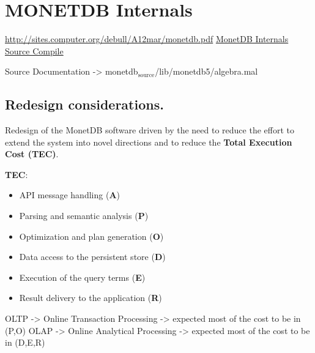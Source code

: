 \documentclass[11pt]{article}
\author{Lucas Pereira}
\date{\today}
\title{}
\begin{document}
\tableofcontents


\section{MONETDB Internals}
\label{sec:orgc4fc073}

\url{http://sites.computer.org/debull/A12mar/monetdb.pdf}
\href{https://www.monetdb.org/Documentation/MonetDBInternals/Overview}{MonetDB Internals}
\href{https://www.monetdb.org/Developers/SourceCompile}{Source Compile}

Source Documentation -> monetdb\(_{\text{source}}\)/lib/monetdb5/algebra.mal

\subsection{Redesign considerations.}
\label{sec:orgbc7f831}
Redesign of the MonetDB software driven by the need to reduce the effort to extend the system into novel directions and to reduce
the \textbf{Total Execution Cost (TEC)}.

\textbf{TEC}:
\begin{itemize}
\item API message handling                (\textbf{A})
\item Parsing and semantic analysis       (\textbf{P})
\item Optimization and plan generation    (\textbf{O})
\item Data access to the persistent store (\textbf{D})
\item Execution of the query terms        (\textbf{E})
\item Result delivery to the application  (\textbf{R})
\end{itemize}

OLTP -> Online Transaction Processing -> expected most of the cost to be in (P,O)
OLAP -> Online Analytical Processing  -> expected most of the cost to be in (D,E,R)
\end{document}

